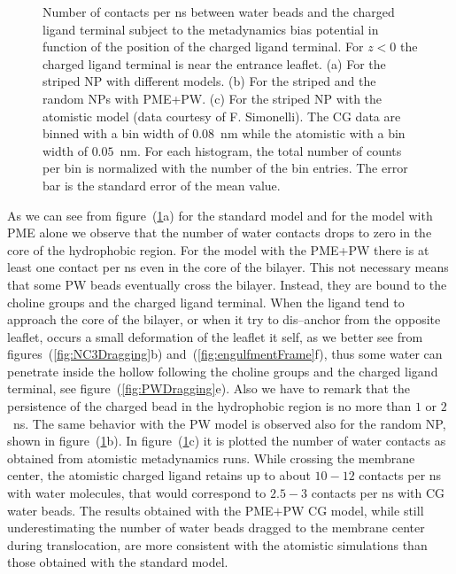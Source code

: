 \begin{figure}[ht!]
{	}%
	\caption{Number of contacts per ns between water beads and the charged ligand terminal subject to the metadynamics bias potential in function of the position of the charged ligand terminal. For $z<0$ the charged ligand terminal is near the entrance leaflet. (a) For the striped \acs{NP} with different models. (b) For the striped and the random \acs{NP}s with \acs{PME}+\acs{PW}. (c) For the striped \acs{NP} with the atomistic model (data courtesy of F. Simonelli). The \ac{CG} data are binned with a bin width of $0.08$~nm while the atomistic with a bin width of $0.05$~nm. For each histogram, the total number of counts per bin is normalized with the number of the bin entries. The error bar is the standard error of the mean value.}%
	\label{fig:WContact}
\end{figure}

As we can see from figure~(\ref{fig:WContact}a) for the standard \martini model and for the model with \ac{PME} alone we observe that the number of water contacts drops to zero in the core of the hydrophobic region. For the model with the \ac{PME}+\ac{PW} there is at least one contact per ns even in the core of the bilayer. This not necessary means that some \ac{PW} beads eventually cross the bilayer. Instead, they are bound to the choline groups and the charged ligand terminal. When the ligand tend to approach the core of the bilayer, or when it try to dis--anchor from the opposite leaflet, occurs a small deformation of the leaflet it self, as we better see from figures~(\ref{fig:NC3Dragging}b) and~(\ref{fig:engulfmentFrame}f), thus some water can penetrate inside the hollow following the choline groups and the charged ligand terminal, see figure~(\ref{fig:PWDragging}e). Also we have to remark that the persistence of the charged bead in the hydrophobic region is no more than $1$ or $2$~ns. The same behavior with the \ac{PW} model is observed also for the random \ac{NP}, shown in figure~(\ref{fig:WContact}b). In figure~(\ref{fig:WContact}c) it is plotted the number of water contacts as obtained from atomistic metadynamics runs. While crossing the membrane center, the atomistic charged ligand retains up to about $10-12$ contacts per ns with water molecules, that would correspond to $2.5-3$ contacts per ns with \martini \ac{CG} water beads. The results obtained with the \ac{PME}$+$\ac{PW} \ac{CG} model, while still underestimating the number of water beads dragged to the membrane center during translocation, are more consistent with the atomistic simulations than those obtained with the standard \martini model.

